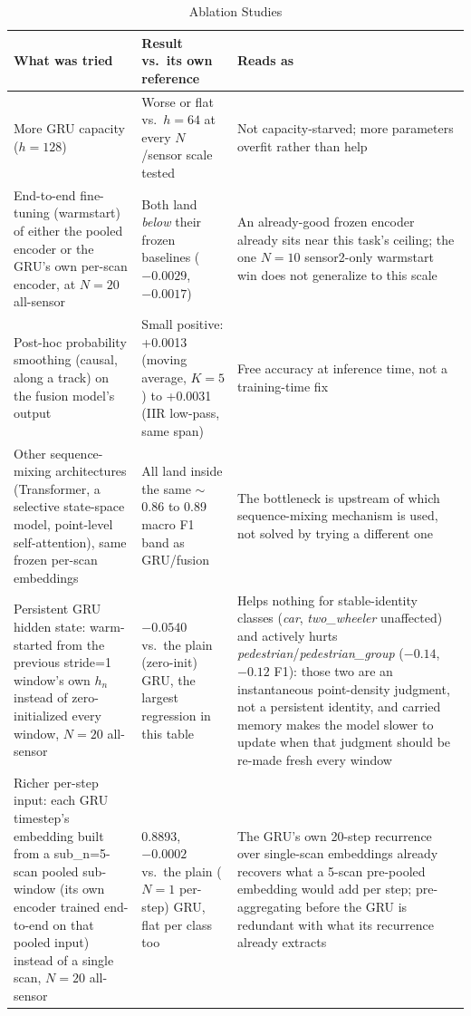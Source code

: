 \documentclass[10pt,letterpaper]{IEEEtran}
\begin{document}
\begin{table}[t]
  \centering
  \caption{Ablation Studies}
  \label{tab:ablation}
  \footnotesize
  \begin{tabular}{p{}p{}p{}}
    \toprule
    What was tried & Result vs.\ its own reference & Reads as \\
    \midrule
    More GRU capacity ($h=128$) & Worse or flat vs.\ $h=64$ at every $N$/sensor scale tested & Not capacity-starved; more parameters overfit rather than help \\
    \addlinespace
    End-to-end fine-tuning (warmstart) of either the pooled encoder or the GRU's own per-scan encoder, at $N=20$ all-sensor & Both land \emph{below} their frozen baselines ($-0.0029$, $-0.0017$) & An already-good frozen encoder already sits near this task's ceiling; the one $N=10$ sensor2-only warmstart win does not generalize to this scale \\
    \addlinespace
    Post-hoc probability smoothing (causal, along a track) on the fusion model's output & Small positive: +0.0013 (moving average, $K=5$) to +0.0031 (IIR low-pass, same span) & Free accuracy at inference time, not a training-time fix \\
    \addlinespace
    Other sequence-mixing architectures (Transformer, a selective state-space model, point-level self-attention), same frozen per-scan embeddings & All land inside the same $\sim$0.86 to 0.89 macro F1 band as GRU/fusion & The bottleneck is upstream of which sequence-mixing mechanism is used, not solved by trying a different one \\
    \addlinespace
    Persistent GRU hidden state: warm-started from the previous stride=1 window's own $h_n$ instead of zero-initialized every window, $N=20$ all-sensor & $-0.0540$ vs.\ the plain (zero-init) GRU, the largest regression in this table & Helps nothing for stable-identity classes (\emph{car}, \emph{two\_wheeler} unaffected) and actively hurts \emph{pedestrian}/\emph{pedestrian\_group} ($-0.14$, $-0.12$ F1): those two are an instantaneous point-density judgment, not a persistent identity, and carried memory makes the model slower to update when that judgment should be re-made fresh every window \\
    \addlinespace
    Richer per-step input: each GRU timestep's embedding built from a sub\_n=5-scan pooled sub-window (its own encoder trained end-to-end on that pooled input) instead of a single scan, $N=20$ all-sensor & 0.8893, $-0.0002$ vs.\ the plain ($N=1$ per-step) GRU, flat per class too & The GRU's own 20-step recurrence over single-scan embeddings already recovers what a 5-scan pre-pooled embedding would add per step; pre-aggregating before the GRU is redundant with what its recurrence already extracts \\

\end{tabular}
\end{table}
\end{document}
